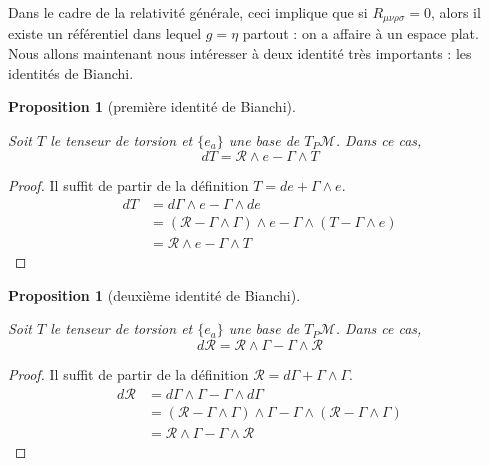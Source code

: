 \documentclass[a4paper,11pt]{report}
\theoremstyle{definition}
\theoremstyle{plain}
\newtheorem{prop}[thm]{Proposition}
\theoremstyle{definition}
\theoremstyle{remark}
\newcommand{\M}{\mathscr{M}}
\begin{document}
                Dans le cadre de la relativité générale, ceci implique que si $R_{\mu\nu\rho\sigma} = 0$, alors il existe un référentiel dans lequel $g = \eta$ partout : on a affaire à un espace plat.\\
            
                Nous allons maintenant nous intéresser à deux identité très importants : les identités de Bianchi.
                
                \begin{prop}[première identité de Bianchi]\begin{leftbar}
                    Soit $T$ le tenseur de torsion et $\{e_a\}$ une base de $T_P\M$. Dans ce cas,
                    \begin{equation}
                        dT = \mathscr{R} \wedge e - \Gamma\wedge T
                    \end{equation}
                \end{leftbar}\end{prop}
                
                \begin{proof}
                    Il suffit de partir de la définition $T = de+\Gamma\wedge e$.
                    \begin{align}
                        dT &= d\Gamma\wedge e - \Gamma \wedge de\\
                        &= (\mathscr{R}-\Gamma\wedge\Gamma)\wedge e-\Gamma\wedge(T-\Gamma\wedge e)\\
                        &= \mathscr{R} \wedge e - \Gamma\wedge T
                    \end{align}
                \end{proof}
                
                \begin{prop}[deuxième identité de Bianchi]\begin{leftbar}
                    Soit $T$ le tenseur de torsion et $\{e_a\}$ une base de $T_P\M$. Dans ce cas,
                    \begin{equation}
                        d\mathscr{R} = \mathscr{R} \wedge \Gamma - \Gamma\wedge \mathscr{R}
                    \end{equation}
                \end{leftbar}\end{prop}
                
                \begin{proof}
                    Il suffit de partir de la définition $\mathscr{R} = d\Gamma+\Gamma\wedge\Gamma$.
                    \begin{align}
                        d\mathscr{R} &= d\Gamma\wedge\Gamma-\Gamma\wedge d\Gamma\\
                        &= (\mathscr{R}-\Gamma\wedge\Gamma)\wedge\Gamma - \Gamma\wedge(\mathscr{R}-\Gamma\wedge\Gamma)\\
                        &= \mathscr{R} \wedge \Gamma - \Gamma\wedge \mathscr{R}
                    \end{align}
                \end{proof}
                
\end{document}
